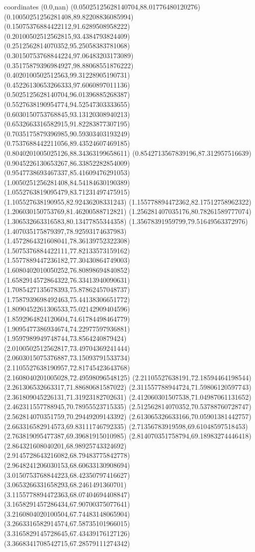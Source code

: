 coordinates {%
(0.0,nan)
(0.05025125628140704,88.01776480120276)
(0.10050251256281408,89.82208836085994)
(0.15075376884422112,91.6289508958222)
(0.20100502512562815,93.4384793824409)
(0.2512562814070352,95.25058383781068)
(0.30150753768844224,97.06483203173089)
(0.35175879396984927,98.88068551876222)
(0.4020100502512563,99.31228905190731)
(0.45226130653266333,97.6060897011136)
(0.5025125628140704,96.01396885268387)
(0.5527638190954774,94.52547303333655)
(0.6030150753768845,93.13120308940213)
(0.6532663316582915,91.82283877307195)
(0.7035175879396985,90.59303403193249)
(0.7537688442211056,89.43524607469185)
(0.8040201005025126,88.34363199658611)
(0.8542713567839196,87.312957516639)
(0.9045226130653267,86.33852282854009)
(0.9547738693467337,85.41609476291053)
(1.0050251256281408,84.54184630190389)
(1.0552763819095479,83.71231497475915)
(1.105527638190955,82.92436208331243)
(1.155778894472362,82.17512758962322)
(1.206030150753769,81.46200588712821)
(1.256281407035176,80.78261589777074)
(1.306532663316583,80.13477855344358)
(1.35678391959799,79.51649563372976)
(1.407035175879397,78.92593174637983)
(1.4572864321608041,78.36139752322308)
(1.5075376884422111,77.82133573159162)
(1.5577889447236182,77.30430864749003)
(1.6080402010050252,76.80898694840852)
(1.6582914572864322,76.33413940090631)
(1.7085427135678393,75.87862457048737)
(1.7587939698492463,75.44138306651772)
(1.8090452261306533,75.02142909404596)
(1.8592964824120604,74.61784498464779)
(1.9095477386934674,74.22977597936881)
(1.9597989949748744,73.8564240879424)
(2.0100502512562817,73.49704369241444)
(2.0603015075376887,73.15093791533734)
(2.1105527638190957,72.81745423643768)
(2.1608040201005028,72.49598096548125)
(2.21105527638191,72.18594464198544)
(2.261306532663317,71.88680681587022)
(2.311557788944724,71.59806120597743)
(2.361809045226131,71.31923182702631)
(2.412060301507538,71.04987061131652)
(2.462311557788945,70.78955523715335)
(2.512562814070352,70.53788760728747)
(2.562814070351759,70.29449209143392)
(2.613065326633166,70.05901381442757)
(2.663316582914573,69.83111746792335)
(2.71356783919598,69.61048597518453)
(2.763819095477387,69.39681915010985)
(2.814070351758794,69.18983274446418)
(2.864321608040201,68.98925743324692)
(2.9145728643216082,68.79483775842778)
(2.9648241206030153,68.60633130908694)
(3.0150753768844223,68.42350797416627)
(3.0653266331658293,68.2461491360701)
(3.1155778894472363,68.07404694408847)
(3.1658291457286434,67.90700375077641)
(3.2160804020100504,67.74483148065904)
(3.2663316582914574,67.58735101966015)
(3.3165829145728645,67.43439176127126)
(3.3668341708542715,67.28579111274342)
}
